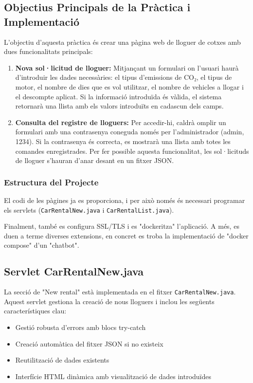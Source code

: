 \documentclass[12pt,a4paper]{article}
\begin{document}
\subsection{Objectius Principals de la Pràctica i Implementació}

L'objectiu d'aquesta pràctica és crear una pàgina web de lloguer de cotxes amb dues funcionalitats principals:

\begin{enumerate}
    \item \textbf{Nova sol·licitud de lloguer:} Mitjançant un formulari on l'usuari haurà d'introduir les dades necessàries: el tipus d'emissions de CO₂, el tipus de motor, el nombre de dies que es vol utilitzar, el nombre de vehicles a llogar i el descompte aplicat. Si la informació introduïda és vàlida, el sistema retornarà una llista amb els valors introduïts en cadascun dels camps.
    
    \item \textbf{Consulta del registre de lloguers:} Per accedir-hi, caldrà omplir un formulari amb una contrasenya coneguda només per l'administrador (admin, 1234). Si la contrasenya és correcta, es mostrarà una llista amb totes les comandes enregistrades. Per fer possible aquesta funcionalitat, les sol·licituds de lloguer s'hauran d'anar desant en un fitxer JSON.
\end{enumerate}

\subsubsection{Estructura del Projecte}

El codi de les pàgines ja es proporciona, i per això només és necessari programar els servlets (\texttt{CarRentalNew.java} i \texttt{CarRentalList.java}).

Finalment, també es configura SSL/TLS i es "dockeritza" l'aplicació. A més, es duen a terme diverses extensions, en concret es troba la implementació de "docker compose" d'un "chatbot".

\newpage
\subsection{Servlet CarRentalNew.java}

La secció de "New rental" està implementada en el fitxer \texttt{CarRentalNew.java}. Aquest servlet gestiona la creació de nous lloguers i inclou les següents característiques clau:

\begin{itemize}
    \item Gestió robusta d'errors amb blocs try-catch
    \item Creació automàtica del fitxer JSON si no existeix
    \item Reutilització de dades existents
    \item Interfície HTML dinàmica amb visualització de dades introduïdes
\end{itemize}
\end{document}
